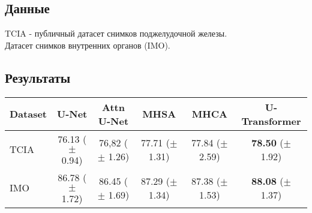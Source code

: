 \subsection*{Данные}
TCIA - публичный датасет снимков поджелудочной железы.\\
Датасет снимков внутренних органов (IMO).
\subsection*{Результаты}


{\small 
\begin{center}

    \begin{tabular}{l|cc|ccc}
        \toprule[1pt]
        Dataset & U-Net & Attn U-Net & MHSA & MHCA & U-Transformer \\
        \hline
        TCIA & 76.13 ($\pm$ 0.94) & 76,82 ($\pm$ 1.26) & 77.71 ($\pm$ 1.31) & 77.84 ($\pm$ 2.59) & \textbf{78.50} ($\pm$ 1.92) \\
        IMO & 86.78 ($\pm$ 1.72) & 86.45 ($\pm$ 1.69) & 87.29 ($\pm$ 1.34) & 87.38 ($\pm$ 1.53) & \textbf{88.08} ($\pm$ 1.37) \\
        \toprule[1pt]
    \end{tabular}



\end{center}
}


